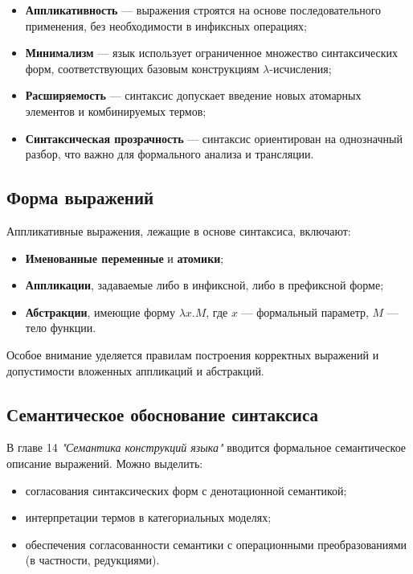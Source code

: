 \begin{itemize}
  \item \textbf{Аппликативность} — выражения строятся на основе последовательного применения, без необходимости в инфиксных операциях;
  \item \textbf{Минимализм} — язык использует ограниченное множество синтаксических форм, соответствующих базовым конструкциям $\lambda$-исчисления;
  \item \textbf{Расширяемость} — синтаксис допускает введение новых атомарных элементов и комбинируемых термов;
  \item \textbf{Синтаксическая прозрачность} — синтаксис ориентирован на однозначный разбор, что важно для формального анализа и трансляции.
\end{itemize}

\subsection*{Форма выражений}

Аппликативные выражения, лежащие в основе синтаксиса, включают:

\begin{itemize}
  \item \textbf{Именованные переменные} и \textbf{атомики};
  \item \textbf{Аппликации}, задаваемые либо в инфиксной, либо в префиксной форме;
  \item \textbf{Абстракции}, имеющие форму $\lambda x. M$, где $x$ — формальный параметр, $M$ — тело функции.
\end{itemize}

Особое внимание уделяется правилам построения корректных выражений и допустимости вложенных аппликаций и абстракций.

\subsection*{Семантическое обоснование синтаксиса}

В главе 14 \textit{"Семантика конструкций языка"} \cite{Wolfengagen2004} вводится формальное семантическое описание выражений. Можно выделить:

\begin{itemize}
  \item согласования синтаксических форм с денотационной семантикой;
  \item интерпретации термов в категориальных моделях;
  \item обеспечения согласованности семантики с операционными преобразованиями (в частности, редукциями).
\end{itemize}

